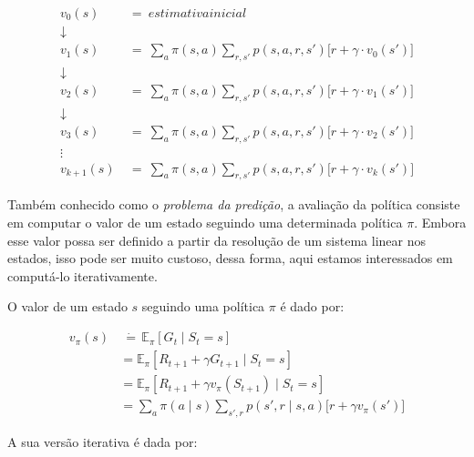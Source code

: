 \documentclass{article}
\begin{document}
        \begin{equation}
        \begin{split}
            v_0(s) & \ = \ estimativa inicial\\
            \downarrow\\
            v_1(s) & \ = \ \sum_{a} \pi(s, a) \sum_{r, s'} p(s, a, r, s') \Big[ r + \gamma \cdot v_0(s') \Big]\\
            \downarrow\\
            v_2(s) & \ = \ \sum_{a} \pi(s, a) \sum_{r, s'} p(s, a, r, s') \Big[ r + \gamma \cdot v_1(s') \Big]\\
            \downarrow\\
            v_3(s) & \ = \ \sum_{a} \pi(s, a) \sum_{r, s'} p(s, a, r, s') \Big[ r + \gamma \cdot v_2(s') \Big]\\
            \vdots\\
            v_{k+1}(s) & \ = \ \sum_{a} \pi(s, a) \sum_{r, s'} p(s, a, r, s') \Big[ r + \gamma \cdot v_k(s') \Big]
        \end{split}
        \end{equation}

        Também conhecido como o \textit{problema da predição}, a avaliação da política consiste em computar o valor de um estado seguindo uma determinada política $\pi$. Embora esse valor possa ser definido a partir da resolução de um sistema linear nos estados, isso pode ser muito custoso, dessa forma, aqui estamos interessados em computá-lo iterativamente.
        
        O valor de um estado $s$ seguindo uma política $\pi$ é dado por:
        
        \begin{equation}
            \begin{split}
                v_{\pi}(s) & \ \dot{=} \, \mathbb{E}_{\pi} \left[ G_t \mid S_t = s \right] \\
                & = \mathbb{E}_{\pi} \left[ R_{t+1} + \gamma G_{t+1} \mid S_t = s \right] \\
                & = \mathbb{E}_{\pi} \left[ R_{t+1} + \gamma v_{\pi}(S_{t+1}) \mid S_t = s \right] \\
                & = \sum_a \pi(a \mid s) \sum_{s',r} p(s',r \mid s,a) \Big[ r + \gamma v_{\pi}(s') \Big]
            \end{split}
        \end{equation}
                
        A sua versão iterativa é dada por:
        
\end{document}
